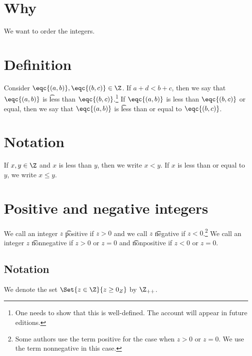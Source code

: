 
\section*{Why}

We want to order the integers.

\section*{Definition}

Consider $\eqc{(a, b)}, \eqc{(b, c)} \in \Z $.
If $a + d < b + c$, then we say that
$\eqc{(a, b)}$ is \t{less than} $\eqc{(b, c)}$.\footnote{One needs to show that this is well-defined. The account will appear in future editions.}
If $\eqc{(a, b)}$ is less than $\eqc{(b, c)}$ or equal, then we say that $\eqc{(a, b)}$ is \t{less than or equal to} $\eqc{(b, c)}$.

\section*{Notation}

If $x, y \in \Z $ and $x$ is less than $y$, then we write $x < y$.
If $x$ is less than or equal to $y$, we write $x \leq y$.

\section*{Positive and negative integers}

We call an integer $z$ \t{positive} if $z > 0$ and we call $z$ \t{negative} if $z < 0$.\footnote{Some authors use the term positive for the case when $z > 0$ or $z = 0$. We use the term nonnegative in this case.}
We call an integer $z$ \t{nonnegative} if $z > 0$ or $z = 0$ and \t{nonpositive} if $z < 0$ or $z = 0$.

\subsection*{Notation}

We denote the set $\Set{z \in \Z }{z \geq 0_{Z}}$ by $\Z _{++}$.

\blankpage